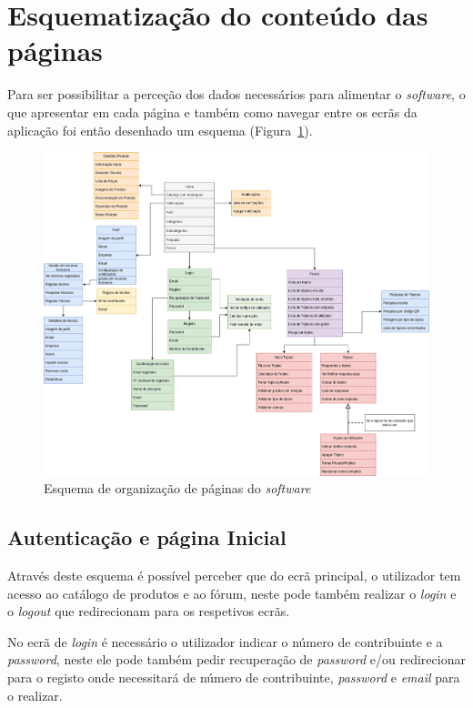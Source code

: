 \section{Esquematização do conteúdo das páginas}

Para ser possibilitar a perceção dos dados necessários para alimentar o \textit{software}, o que apresentar em cada página e também como navegar entre os ecrãs da aplicação foi então desenhado um esquema 
(Figura~\ref{fig:3}).

\begin{figure}[htb]
  \centering
  
  \includegraphics[width=\textwidth]{images/Arquiteturas/diagrama_superficial_de_aplicacao.png}
  \caption{Esquema de organização de páginas do \textit{software}}
  \label{fig:3}
\end{figure}

\newpage

\subsection{Autenticação e página Inicial}

Através deste esquema é possível perceber que do ecrã principal, o utilizador tem acesso ao 
catálogo de produtos e ao fórum, neste pode também realizar o \textit{login} e o \textit{logout} que redirecionam para os respetivos ecrãs.

No ecrã de \textit{login} é necessário o utilizador indicar o número de contribuinte e a \textit{\textit{password}}, neste ele pode também pedir recuperação de \textit{\textit{password}} e/ou redirecionar para o registo onde necessitará de número de contribuinte, \textit{\textit{password}} e \textit{email} para o realizar.

